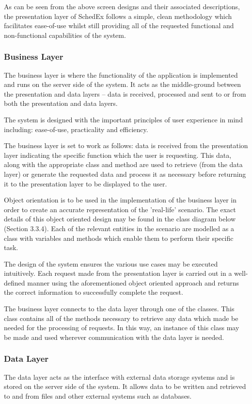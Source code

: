 \documentclass{article}
\begin{document}
As can be seen from the above screen designs and their associated descriptions, the presentation layer of SchedEx follows a simple, clean methodology which facilitates ease-of-use whilst still providing all of the requested functional and non-functional capabilities of the system.

\subsubsection{Business Layer}
The business layer is where the functionality of the application is implemented and runs on the server side of the system. It acts as the middle-ground between the presentation and data layers – data is received, processed and sent to or from both the presentation and data layers.

The system is designed with the important principles of user experience in mind including: ease-of-use, practicality and efficiency.

The business layer is set to work as follows: data is received from the presentation layer indicating the specific function which the user is requesting. This data, along with the appropriate class and method are used to retrieve (from the data layer) or generate the requested data and process it as necessary before returning it to the presentation layer to be displayed to the user.

Object orientation is to be used in the implementation of the business layer in order to create an accurate representation of the 'real-life' scenario. The exact details of this object oriented design may be found in the class diagram below (Section 3.3.4). Each of the relevant entities in the scenario are modelled as a class with variables and methods which enable them to perform their specific task.

The design of the system ensures the various use cases may be executed intuitively. Each request made from the presentation layer is carried out in a well-defined manner using the aforementioned object oriented approach and returns the correct information to successfully complete the request.

The business layer connects to the data layer through one of the classes. This class contains all of the methods necessary to retrieve any data which made be needed for the processing of requests. In this way, an instance of this class may be made and used wherever communication with the data layer is needed.

\subsubsection{Data Layer}
The data layer acts as the interface with external data storage systems and is stored on the server side of the system. It allows data to be written and
retrieved to and from files and other external systems such as databases.
\end{document}
